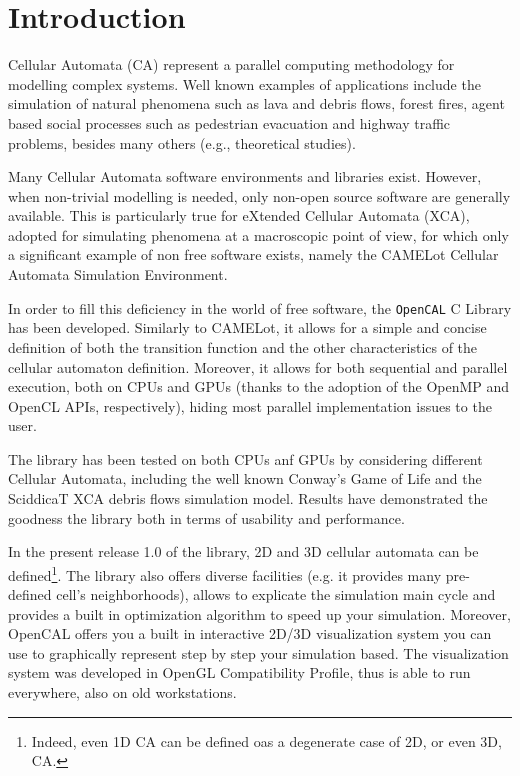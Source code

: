 \chapter{Introduction}

Cellular Automata (CA) represent a parallel computing methodology for
modelling complex systems. Well known examples of applications include
the simulation of natural phenomena such as lava and debris flows,
forest fires, agent based social processes such as pedestrian
evacuation and highway traffic problems, besides many others (e.g.,
theoretical studies).

Many Cellular Automata software environments and libraries exist.
However, when non-trivial modelling is needed, only non-open source
software are generally available. This is particularly true for
eXtended Cellular Automata (XCA), adopted for simulating phenomena at
a macroscopic point of view, for which only a significant example of
non free software exists, namely the CAMELot Cellular Automata
Simulation Environment.

In order to fill this deficiency in the world of free software, the
\verb'OpenCAL' C Library has been developed. Similarly to CAMELot, it
allows for a simple and concise definition of both the transition
function and the other characteristics of the cellular automaton
definition. Moreover, it allows for both sequential and parallel
execution, both on CPUs and GPUs (thanks to the adoption of the OpenMP
and OpenCL APIs, respectively), hiding most parallel implementation issues
to the user.

The library has been tested on both CPUs anf GPUs by considering
different Cellular Automata, including the well known Conway's Game of
Life and the SciddicaT XCA debris flows simulation model. Results have
demonstrated the goodness the library both in terms of usability and
performance.

In the present release 1.0 of the library, 2D and 3D cellular automata
can be defined\footnote{Indeed, even 1D CA can be defined oas a
  degenerate case of 2D, or even 3D, CA.}. The library also offers
diverse facilities (e.g. it provides many pre-defined cell's
neighborhoods), allows to explicate the simulation main cycle and
provides a built in optimization algorithm to speed up your
simulation. Moreover, OpenCAL offers you a built in interactive 2D/3D
visualization system you can use to graphically represent step by step
your simulation based. The visualization system was developed in
OpenGL Compatibility Profile, thus is able to run everywhere, also on
old workstations.

